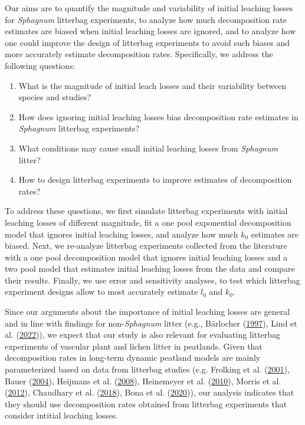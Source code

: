\documentclass[
  12pt,
]{article}
\begin{document}
Our aims are to quantify the magnitude and variability of initial leaching losses for \emph{Sphagnum} litterbag experiments, to analyze how much decomposition rate estimates are biased when initial leaching losses are ignored, and to analyze how one could improve the design of litterbag experiments to avoid such biases and more accurately estimate decomposition rates. Specifically, we address the following questions:

\begin{enumerate}
\def\labelenumi{\arabic{enumi}.}
\item
  What is the magnitude of initial leach losses and their variability between species and studies?
\item
  How does ignoring initial leaching losses bias decomposition rate estimates in \emph{Sphagnum} litterbag experiments?
\item
  What conditions may cause small initial leaching losses from \emph{Sphagnum} litter?
\item
  How to design litterbag experiments to improve estimates of decomposition rates?
\end{enumerate}

To address these questions, we first simulate litterbag experiments with initial leaching losses of different magnitude, fit a one pool exponential decomposition model that ignores initial leaching losses, and analyze how much \(k_0\) estimates are biased. Next, we re-analyze litterbag experiments collected from the literature with a one pool decomposition model that ignores initial leaching losses and a two pool model that estimates initial leaching losses from the data and compare their results. Finally, we use error and sensitivity analyses, to test which litterbag experiment designs allow to most accurately estimate \(l_0\) and \(k_0\).

Since our arguments about the importance of initial leaching losses are general and in line with findings for non-\emph{Sphagnum} litter (e.g., Bärlocher (\protect\hyperlink{ref-Barlocher.1997}{1997}), Lind et al. (\protect\hyperlink{ref-Lind.2022}{2022})), we expect that our study is also relevant for evaluating litterbag experiments of vascular plant and lichen litter in peatlands. Given that decomposition rates in long-term dynamic peatland models are mainly parameterized based on data from litterbag studies (e.g. Frolking et al. (\protect\hyperlink{ref-Frolking.2001}{2001}), Bauer (\protect\hyperlink{ref-Bauer.2004}{2004}), Heijmans et al. (\protect\hyperlink{ref-Heijmans.2008}{2008}), Heinemeyer et al. (\protect\hyperlink{ref-Heinemeyer.2010}{2010}), Morris et al. (\protect\hyperlink{ref-Morris.2012}{2012}), Chaudhary et al. (\protect\hyperlink{ref-Chaudhary.2018}{2018}), Bona et al. (\protect\hyperlink{ref-Bona.2020}{2020})), our analysis indicates that they should use decomposition rates obtained from litterbag experiments that consider intitial leaching losses.
\end{document}
